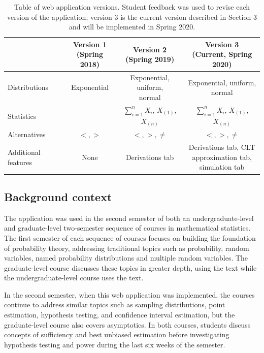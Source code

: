 \documentclass{TISE}
\begin{document}
\begin{table}[H]
	\centering
	\begin{tabular}{|l|c|c|c|}
	\hline
	\thead{} & \thead{Version 1 \\ (Spring 2018)} & \thead{Version 2 \\ (Spring 2019)} & \thead{Version 3 \\ (Current, Spring 2020)} \\
	\hline
	Distributions & Exponential & \makecell{Exponential, uniform, \\ normal} & \makecell{Exponential, uniform, \\ normal} \\
	Statistics & \makecell{$\sum_{i=1}^n X_i$, $X_{(1)}$} & $\sum_{i=1}^n X_i$, $X_{(1)}$, $X_{(n)}$ & $\sum_{i=1}^n X_i$, $X_{(1)}$, $X_{(n)}$ \\[5mm]
	Alternatives & $<, >$ & $<, >, \neq$ & $<, >, \neq$ \\
	Additional features & None & Derivations tab & \makecell{Derivations tab, CLT \\ approximation tab, \\ simulation tab}\\
	\hline
	\end{tabular}
	\caption{Table of web application versions. Student feedback was used to revise each version of the application; version 3 is the current version described in Section 3 and will be implemented in Spring 2020.}
\end{table}

\subsection{Background context}

The application was used in the second semester of both an undergraduate-level and graduate-level two-semester sequence of courses in mathematical statistics. The first semester of each sequence of courses focuses on building the foundation of probability theory, addressing traditional topics such as probability, random variables, named probability distributions and multiple random variables. The graduate-level course discusses these topics in greater depth, using the \cite{casella2002} text while the undergraduate-level course uses the \cite{wackerly2008} text. 

In the second semester, when this web application was implemented, the courses continue to address similar topics such as sampling distributions, point estimation, hypothesis testing, and confidence interval estimation, but the graduate-level course also covers asymptotics. In both courses, students discuss concepts of sufficiency and best unbiased estimation before investigating hypothesis testing and power during the last six weeks of the semester. 
\end{document}
